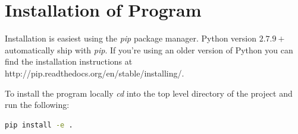 \documentclass[journal]{IEEEtran}
\begin{document}








%


\appendices

\section{Installation of Program}
\label{appendix:installation}
Installation is easiest using the \textit{pip} package manager. Python version $2.7.9+$ automatically ship with \textit{pip}. If you're using an older version of Python you can find the installation instructions at http://pip.readthedocs.org/en/stable/installing/.

To install the program locally \textit{cd} into the top level directory of the project and run the following:

\begin{lstlisting}[language=Bash]
pip install -e .	
\end{lstlisting}
\end{document}

